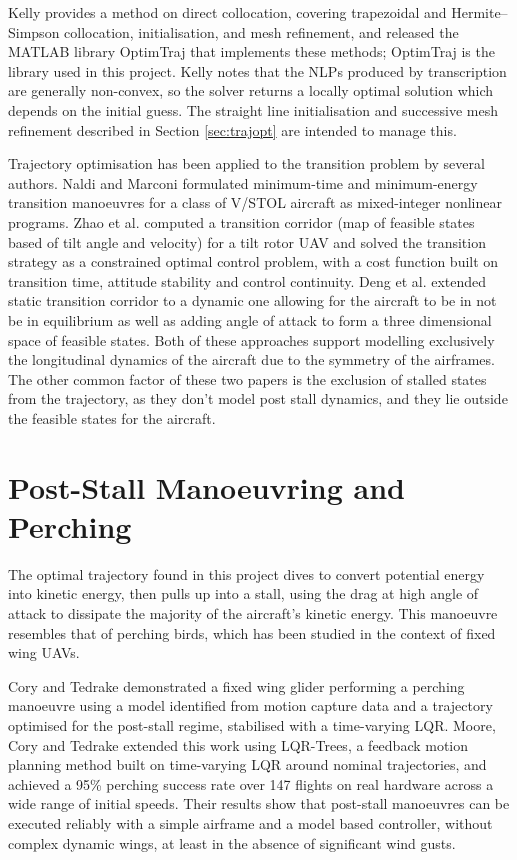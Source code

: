 Kelly \cite{kelly2017introduction} provides a method on direct collocation, covering trapezoidal and Hermite--Simpson collocation, initialisation, and mesh refinement, and released the MATLAB library OptimTraj \cite{kelly2022optimtraj} that implements these methods; OptimTraj is the library used in this project. Kelly notes that the NLPs produced by transcription are generally non-convex, so the solver returns a locally optimal solution which depends on the initial guess. The straight line initialisation and successive mesh refinement described in Section \ref{sec:trajopt} are intended to manage this.

Trajectory optimisation has been applied to the transition problem by several authors. Naldi and Marconi \cite{naldi2011optimal} formulated minimum-time and minimum-energy transition manoeuvres for a class of V/STOL aircraft as mixed-integer nonlinear programs. Zhao et al. \cite{zhao2023multimode} computed a transition corridor (map of feasible states based of tilt angle and velocity) for a tilt rotor UAV and solved the transition strategy as a constrained optimal control problem, with a cost function built on transition time, attitude stability and control continuity. Deng et al. \cite{deng2025pigeon} extended static transition corridor to a dynamic one allowing for the aircraft to be in not be in equilibrium as well as adding angle of attack to form a three dimensional space of feasible states. Both of these approaches support modelling exclusively the longitudinal dynamics of the aircraft due to the symmetry of the airframes.
The other common factor of these two papers is the exclusion of stalled states from the trajectory, as they don't model post stall dynamics, and they lie outside the feasible states for the aircraft.

\section{Post-Stall Manoeuvring and Perching}
\label{sec:lit_perching}

The optimal trajectory found in this project dives to convert potential energy into kinetic energy, then pulls up into a stall, using the drag at high angle of attack to dissipate the majority of the aircraft's kinetic energy. This manoeuvre resembles that of perching birds, which has been studied in the context of fixed wing UAVs.

Cory and Tedrake \cite{cory2008experiments} demonstrated a fixed wing glider performing a perching manoeuvre using a model identified from motion capture data and a trajectory optimised for the post-stall regime, stabilised with a time-varying LQR. Moore, Cory and Tedrake \cite{moore2014robust} extended this work using LQR-Trees, a feedback motion planning method built on time-varying LQR around nominal trajectories, and achieved a 95\% perching success rate over 147 flights on real hardware across a wide range of initial speeds. Their results show that post-stall manoeuvres can be executed reliably with a simple airframe and a model based controller, without complex dynamic wings, at least in the absence of significant wind gusts.

